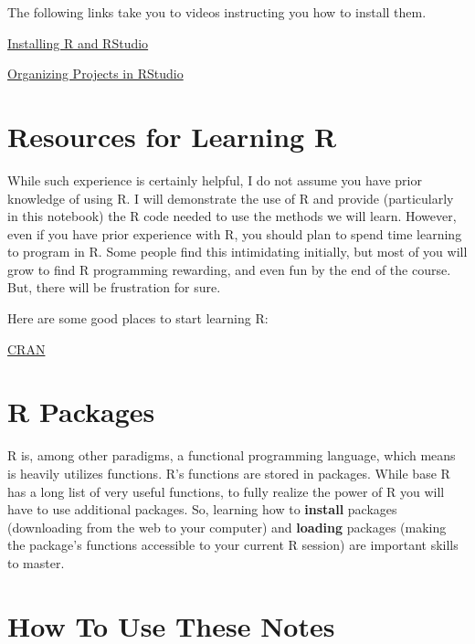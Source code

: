 \documentclass[
]{book}
\begin{document}
The following links take you to videos instructing you how to install them.

\href{https://auburn.hosted.panopto.com/Panopto/Pages/Viewer.aspx?id=5dacd1fe-b888-407b-a89f-ac150135ace8}{Installing R and RStudio}

\href{https://auburn.hosted.panopto.com/Panopto/Pages/Viewer.aspx?id=aed0e2a9-004f-453f-80c7-abbe010a063b}{Organizing Projects in RStudio}

\hypertarget{resources-for-learning-r}{%
\section*{Resources for Learning R}\label{resources-for-learning-r}}

While such experience is certainly helpful, I do not assume you have prior knowledge of using R.
I will demonstrate the use of R and provide (particularly in this notebook) the R code needed to use the methods we will learn.
However, even if you have prior experience with R, you should plan to spend time learning to program in R.
Some people find this intimidating initially, but most of you will grow to find R programming rewarding, and even fun by the end of the course.
But, there will be frustration for sure.

Here are some good places to start learning R:

\href{https://cran.r-project.org/}{CRAN}

\hypertarget{r-packages}{%
\section*{R Packages}\label{r-packages}}

R is, among other paradigms, a functional programming language, which means is heavily utilizes functions.
R's functions are stored in packages.
While base R has a long list of very useful functions, to fully realize the power of R you will have to use additional packages.
So, learning how to \textbf{install} packages (downloading from the web to your computer) and \textbf{loading} packages (making the package's functions accessible to your current R session) are important skills to master.

\hypertarget{how-to-use-these-notes}{%
\section*{How To Use These Notes}\label{how-to-use-these-notes}}
\end{document}
